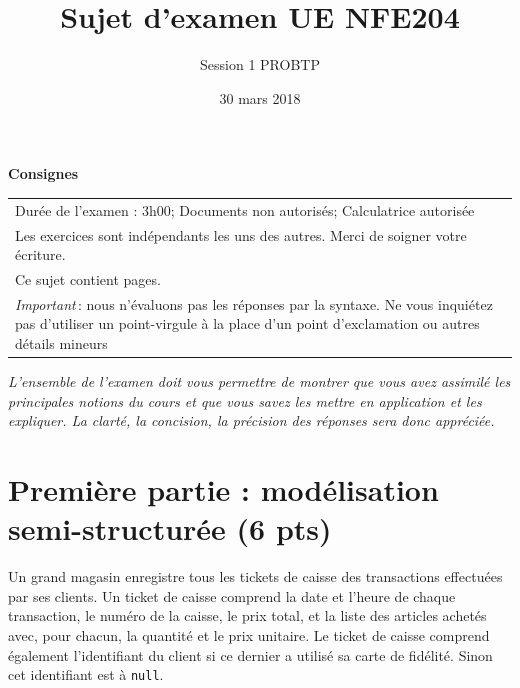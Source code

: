 \documentclass[11pt,a4paper]{article}
\begin{document}
\title{Sujet d'examen UE NFE204}
\author{Session 1 PROBTP}
\date{30 mars  2018}

\maketitle

\begin{center}
{\bf \Large Consignes}\\
\begin{tabular}{| p{15cm} |}
\hline
Dur\'ee de l'examen : 3h00; Documents non autoris\'es;  Calculatrice autoris\'ee\\

Les exercices sont indépendants les uns des autres. Merci de soigner votre écriture.\\
Ce sujet contient \pageref{LastPage} pages.\\

\textit{Important}\,: nous n'évaluons pas les réponses par la syntaxe. Ne vous
inquiétez pas d'utiliser un point-virgule à la place d'un point d'exclamation ou
autres détails mineurs
\\
\hline
\end{tabular}
\end{center}

\emph{L'ensemble de l'examen doit vous permettre de montrer que vous avez assimilé les principales notions
du cours et que vous savez les mettre en application et les expliquer. La clarté, la concision,
la précision des réponses sera donc appréciée.}


\section*{Première partie : modélisation semi-structurée (6 pts)}

Un grand magasin enregistre tous les tickets de caisse des transactions effectuées par ses clients.
Un ticket de caisse comprend la date et l'heure de chaque transaction, le numéro de la caisse, le prix total,
et la liste des articles achetés avec, pour chacun, la quantité et le prix unitaire.  Le ticket de caisse comprend également
l'identifiant du client si ce dernier a utilisé sa carte de fidélité. Sinon cet identifiant
est à \texttt{null}.
\end{document}
